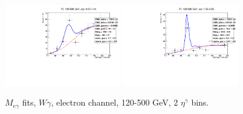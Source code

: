 \begin{figure}[htb]
  \begin{center}
   \includegraphics[width=0.45\textwidth]{../figs/figs_v11/ELECTRON_WGamma/EtoGammaFits/sa_hZmass_h_Data_EtoGamma_Enr_BARREL_pt120to500_ieta0.pdf}
   \includegraphics[width=0.45\textwidth]{../figs/figs_v11/ELECTRON_WGamma/EtoGammaFits/sa_hZmass_h_Data_EtoGamma_Enr_ENDCAP_pt120to500_ieta0.pdf}\\
  \label{fig:etogFits_120to500}
  \caption{$M_{e\gamma}$ fits, $W\gamma$, electron channel, 120-500 GeV, 2 $\eta^{\gamma}$ bins.}
  \end{center}
\end{figure}


